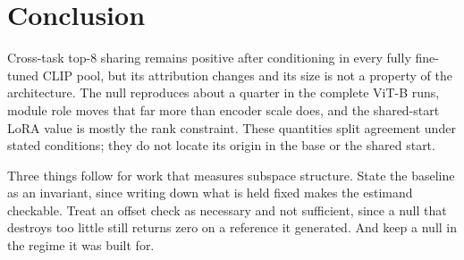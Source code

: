 \section{Conclusion}

Cross-task top-$8$ sharing remains positive after conditioning in every fully fine-tuned CLIP pool,
but its attribution changes and its size is not a property of the architecture. The null reproduces
about a quarter in the complete ViT-B runs, module role moves that far more than encoder scale
does, and the shared-start LoRA value is mostly the rank constraint. These quantities split
agreement under stated conditions; they do not locate its origin in the base or the shared start.

Three things follow for work that measures subspace structure. State the baseline as an invariant,
since writing down what is held fixed makes the estimand checkable. Treat an offset check as
necessary and not sufficient, since a null that destroys too little still returns zero on a
reference it generated. And keep a null in the regime it was built for.

